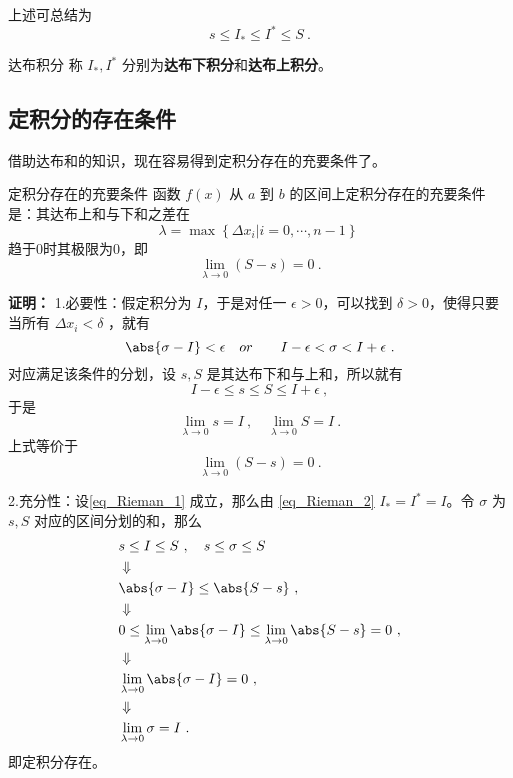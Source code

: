 上述可总结为
\begin{equation}\label{eq_Rieman_2}
s\leq I_*\leq I^*\leq S~.
\end{equation}
\begin{definition}{达布积分}
称 $I_*,I^*$ 分别为\textbf{达布下积分}和\textbf{达布上积分}。
\end{definition}

\subsection{定积分的存在条件}

借助达布和的知识，现在容易得到定积分存在的充要条件了。
\begin{theorem}{定积分存在的充要条件}
函数 $f(x)$ 从 $a$ 到 $b$ 的区间上定积分存在的充要条件是：其达布上和与下和之差在
\begin{equation}
\lambda=\max \left\{\Delta x_i|i=0,\cdots,n-1 \right\} ~
\end{equation}
趋于0时其极限为0，即
\begin{equation}\label{eq_Rieman_1}
\lim_{\lambda\rightarrow0}(S-s)=0~.
\end{equation}
\end{theorem}
\textbf{证明：}
1.必要性：假定积分为 $I$，于是对任一 $\epsilon>0$，可以找到 $\delta>0$，使得只要 当所有 $\Delta x_i<\delta$ ，就有
\begin{equation}
\abs{\sigma-I}<\epsilon\quad or \qquad I-\epsilon<\sigma<I+\epsilon~.
\end{equation}
对应满足该条件的分划，设 $s,S$ 是其达布下和与上和，所以就有
\begin{equation}
I-\epsilon\leq s\leq S\leq I+\epsilon~,
\end{equation}
于是
\begin{equation}
\lim_{\lambda\rightarrow0}s=I~,\quad \lim_{\lambda\rightarrow0}S=I~.
\end{equation}
上式等价于
\begin{equation}
\lim_{\lambda\rightarrow0}(S-s)=0~.
\end{equation}

2.充分性：设\autoref{eq_Rieman_1} 成立，那么由 \autoref{eq_Rieman_2}  $I_*=I^*=I$。令 $\sigma$ 为 $s,S$ 对应的区间分划的和，那么
\begin{equation}
\begin{aligned}
&s\leq I\leq S~,\quad s\leq \sigma\leq S\\
&\Downarrow\\
&\abs{\sigma-I}\leq\abs{S-s}~,\\
&\Downarrow\\
&0\leq\lim_{\lambda\rightarrow0}\abs{\sigma-I}\leq\lim_{\lambda\rightarrow0}\abs{S-s}=0~,\\
&\Downarrow\\
&\lim_{\lambda\rightarrow0}\abs{\sigma-I}=0~,\\
&\Downarrow\\
&\lim_{\lambda\rightarrow0}\sigma=I~.
\end{aligned}
\end{equation}
即定积分存在。

